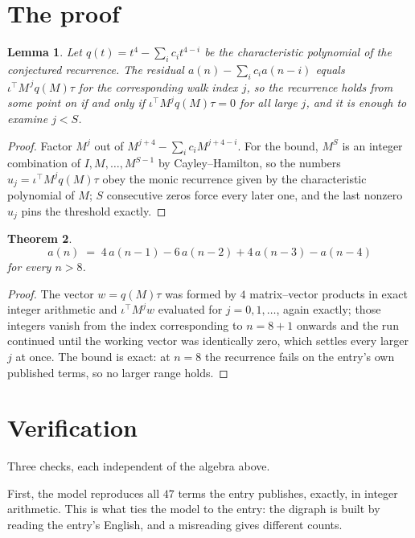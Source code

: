 \documentclass[11pt,a4paper]{article}
\theoremstyle{plain}
\newtheorem{theorem}{Theorem}
\newtheorem{lemma}[theorem]{Lemma}
\theoremstyle{definition}
\begin{document}
\section{The proof}

\begin{lemma}\label{lem:crit}
Let $q(t)=t^{4}-\sum_i c_it^{4-i}$ be the characteristic polynomial of the
conjectured recurrence. The residual $a(n)-\sum_ic_ia(n-i)$ equals
$\iota^{\!\top}M^{\,j}q(M)\tau$ for the corresponding walk index $j$, so the recurrence
holds from some point on if and only if $\iota^{\!\top}M^{j}q(M)\tau=0$ for all large $j$,
and it is enough to examine $j<S$.
\end{lemma}

\begin{proof}
Factor $M^{j}$ out of $M^{j+4}-\sum_ic_iM^{j+4-i}$. For the bound, $M^{S}$
is an integer combination of $I,M,\dots,M^{S-1}$ by Cayley--Hamilton, so the numbers
$u_j=\iota^{\!\top}M^{j}q(M)\tau$ obey the monic recurrence given by the characteristic
polynomial of $M$; $S$ consecutive zeros force every later one, and the last nonzero $u_j$
pins the threshold exactly.
\end{proof}

\begin{theorem}
\[
a(n)\;=\;4\,a(n-1) - 6\,a(n-2) + 4\,a(n-3) - a(n-4)
\]
for every $n>8$.
\end{theorem}

\begin{proof}
The vector $w=q(M)\tau$ was formed by $4$ matrix--vector products in exact integer
arithmetic and $\iota^{\!\top}M^{j}w$ evaluated for $j=0,1,\dots$, again exactly; those
integers vanish from the index corresponding to $n=8+1$ onwards and the run continued
until the working vector was identically zero, which settles every larger $j$ at once. The bound is exact: at $n=8$ the recurrence fails on the entry's own published terms, so no larger range holds.
\end{proof}

\section{Verification}

Three checks, each independent of the algebra above.

First, the model reproduces all $47$ terms the entry publishes, exactly, in integer
arithmetic. This is what ties the model to the entry: the digraph is built by reading the
entry's English, and a misreading gives different counts.
\end{document}
